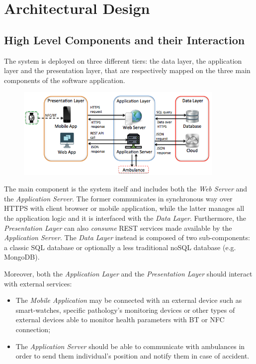 \documentclass[a4paper]{article}
\begin{document}
\newpage
\section{Architectural Design}
\subsection{High Level Components and their Interaction}
The system is deployed on three different tiers: the data layer, the application layer and the presentation layer, that are respectively mapped on the three main components of the software application.
\begin{figure}[!htpb]
    	\centering
    	\includegraphics[width=100mm,keepaspectratio]{images/highlevel.png}
\end{figure}

The main component is the system itself and includes both the \textit{Web Server} and the \textit{Application Server}. The former communicates in synchronous way over HTTPS with client browser or mobile application, while the latter manages all the application logic and it is interfaced with the \textit{Data Layer}. Furthermore, the \textit{Presentation Layer} can also \textit{consume} REST services made available by the \textit{Application Server}. The \textit{Data Layer} instead is composed of two sub-components: a classic SQL database or optionally a less traditional noSQL database (e.g. MongoDB).

Moreover, both the \textit{Application Layer} and the \textit{Presentation Layer} should interact with external services:
\begin{itemize}
    \item The \textit{Mobile Application} may be connected with an external device such as smart-watches, specific pathology's monitoring devices or other types of external devices able to monitor health parameters with BT or NFC connection;
    \item The \textit{Application Server} should be able to communicate with ambulances in order to send them individual's position and notify them in case of accident.
\end{itemize}
\end{document}
